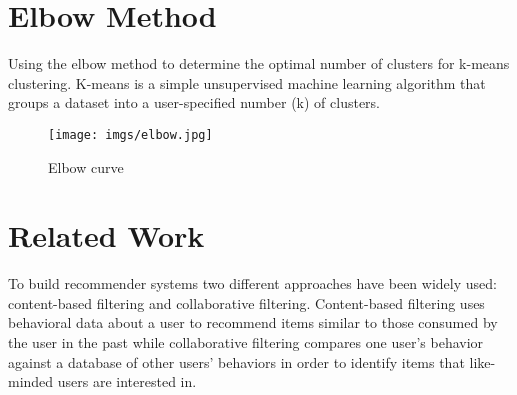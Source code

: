\documentclass[document.tex]{subfiles}
\begin{document}
\section{Elbow Method}
Using the elbow method to determine the optimal number of clusters for k-means clustering. K-means is a simple unsupervised machine learning algorithm that groups a dataset into a user-specified number (k) of clusters.
\begin{figure}[H]
	\centering
	\texttt{[image: imgs/elbow.jpg]}
	\caption[Elbow curve]
	{Elbow curve}
\end{figure}

\section{Related Work}
To build recommender systems two different approaches have been widely used: content-based filtering and collaborative filtering. Content-based  filtering uses behavioral data about a user to recommend items similar to those consumed by the user in the past while collaborative filtering compares one user's behavior against a database of other users' behaviors in order to identify items that like-minded users are interested in. \\
\end{document}
